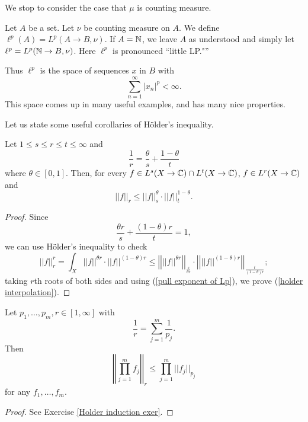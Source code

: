 We stop to consider the case that $\mu$ is counting measure.

\begin{definition}
Let $A$ be a set. Let $\nu$ be counting measure on $A$. We define $\ell^p(A) = L^p(A \to B, \nu)$.
If $A = \mathbb{N}$, we leave $A$ as understood and simply let $\ell^{p} = L^p(\mathbb{N} \to B, \nu)$.
Here $\ell^p$ is pronounced ``little LP."''
\end{definition}

Thus $\ell^p$ is the space of sequences $x$ in $B$ with
\[\sum_{n = 1}^{\infty} |x_{n}|^{p} < \infty.\]
This space comes up in many useful examples, and has many nice properties.

Let us state some useful corollaries of H\"older's inequality.
\begin{corollary}
Let $1 \leq s \leq r \leq t \leq \infty$ and
\[\frac{1}{r} = \frac{\theta}{s} + \frac{1 - \theta}{t}\]
where $\theta \in [0, 1]$. Then, for every $f \in L^s(X \to \mathbb{C}) \cap L^t(X \to \mathbb{C})$, $f \in L^r(X \to \mathbb{C})$ and
\begin{equation}
\label{holder interpolation}
||f||_{r} \leq ||f||_s^{\theta} \cdot ||f||_t^{1-\theta}.
\end{equation}
\end{corollary}
\begin{proof}
Since
\[\frac{\theta r}{s} + \frac{(1 - \theta)r}{t} = 1,\]
we can use H\"older's inequality to check
\[||f||_r^{r} = \int_{X} ||f||^{\theta r} \cdot ||f||^{(1 - \theta)r} \leq \left|\left|||f||^{\theta r}\right|\right|_{\frac{s}{\theta r}} \cdot \left|\left|||f||^{(1 - \theta) r}\right|\right|_{\frac{t}{(1 - \theta)r}};\]
taking $r$th roots of both sides and using (\ref{pull exponent of Lp}), we prove (\ref{holder interpolation}).
\end{proof}

\begin{corollary}
\label{Holder induction}
Let $p_1, \dots, p_{m}, r \in [1, \infty]$ with
\[\frac{1}{r} = \sum_{j=1}^{m} \frac{1}{p_{j}}.\]
Then
\[\left|\left|\prod_{j=1}^{m} f_{j}\right|\right|_{r} \leq \prod_{j=1}^{m} ||f_{j}||_{p_{j}}\]
for any $f_1, \dots, f_{m}$.
\end{corollary}
\begin{proof}
See Exercise \ref{Holder induction exer}.
\end{proof}

